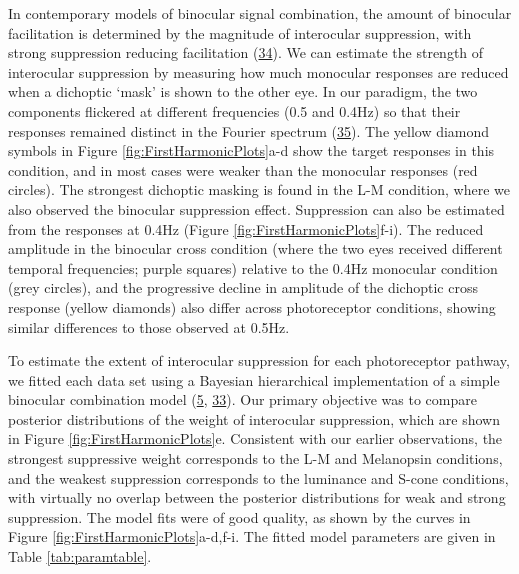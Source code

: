 \documentclass[
]{article}
\begin{document}
In contemporary models of binocular signal combination, the amount of binocular facilitation is determined by the magnitude of interocular suppression, with strong suppression reducing facilitation (\protect\hyperlink{ref-Kingdom2015}{34}). We can estimate the strength of interocular suppression by measuring how much monocular responses are reduced when a dichoptic `mask' is shown to the other eye. In our paradigm, the two components flickered at different frequencies (0.5 and 0.4Hz) so that their responses remained distinct in the Fourier spectrum (\protect\hyperlink{ref-Busse2009}{35}). The yellow diamond symbols in Figure \ref{fig:FirstHarmonicPlots}a-d show the target responses in this condition, and in most cases were weaker than the monocular responses (red circles). The strongest dichoptic masking is found in the L-M condition, where we also observed the binocular suppression effect. Suppression can also be estimated from the responses at 0.4Hz (Figure \ref{fig:FirstHarmonicPlots}f-i). The reduced amplitude in the binocular cross condition (where the two eyes received different temporal frequencies; purple squares) relative to the 0.4Hz monocular condition (grey circles), and the progressive decline in amplitude of the dichoptic cross response (yellow diamonds) also differ across photoreceptor conditions, showing similar differences to those observed at 0.5Hz.

To estimate the extent of interocular suppression for each photoreceptor pathway, we fitted each data set using a Bayesian hierarchical implementation of a simple binocular combination model (\protect\hyperlink{ref-Segala2023}{5}, \protect\hyperlink{ref-Meese2006}{33}). Our primary objective was to compare posterior distributions of the weight of interocular suppression, which are shown in Figure \ref{fig:FirstHarmonicPlots}e. Consistent with our earlier observations, the strongest suppressive weight corresponds to the L-M and Melanopsin conditions, and the weakest suppression corresponds to the luminance and S-cone conditions, with virtually no overlap between the posterior distributions for weak and strong suppression. The model fits were of good quality, as shown by the curves in Figure \ref{fig:FirstHarmonicPlots}a-d,f-i. The fitted model parameters are given in Table \ref{tab:paramtable}.
\end{document}
